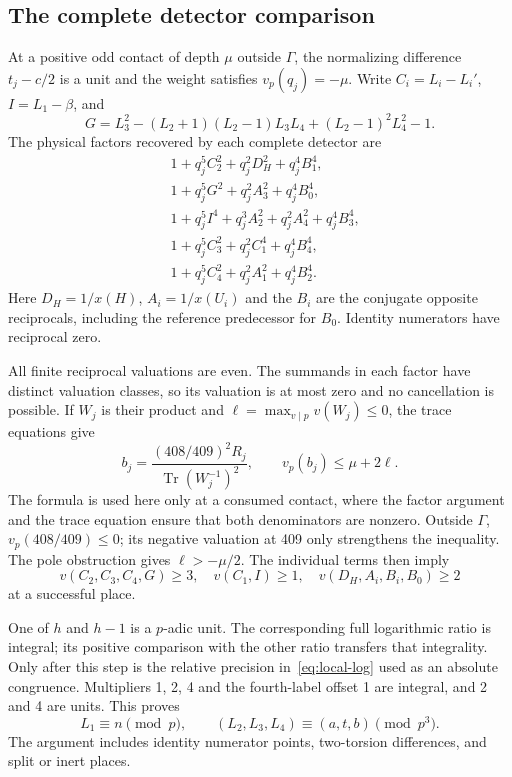\documentclass[11pt,a4paper]{article}
\begin{document}
\subsection{The complete detector comparison}

At a positive odd contact of depth $\mu$ outside $\Gamma$, the
normalizing difference $t_j-c/2$ is a unit and the weight satisfies
$v_p(q_j)=-\mu$.
Write $C_i=L_i-L_i'$, $I=L_1-\beta$, and
\[
 G=L_3^2-(L_2+1)(L_2-1)L_3L_4+(L_2-1)^2L_4^2-1.
\]
The physical factors recovered by each complete detector are
\begin{align*}
 &1+q_j^5C_2^2+q_j^2D_H^2+q_j^4B_1^4,\\
 &1+q_j^5G^2+q_j^2A_3^2+q_j^4B_0^4,\\
 &1+q_j^5I^4+q_j^3A_2^2+q_j^2A_4^2+q_j^4B_3^4,\\
 &1+q_j^5C_3^2+q_j^2C_1^4+q_j^4B_4^4,\\
 &1+q_j^5C_4^2+q_j^2A_1^2+q_j^4B_2^4.
\end{align*}
Here $D_H=1/x(H)$, $A_i=1/x(U_i)$ and the $B_i$ are the
conjugate opposite reciprocals, including the reference predecessor
for $B_0$. Identity numerators have reciprocal zero.

All finite reciprocal valuations are even. The summands in each
factor have distinct valuation classes, so its valuation is at most
zero and no cancellation is possible. If $W_j$ is their product
and $\ell=\max_{v\mid p}v(W_j)\le0$, the trace equations give
\[
 b_j=\frac{(408/409)^2R_j}{\operatorname{Tr}(W_j^{-1})^2},
 \qquad v_p(b_j)\le\mu+2\ell.
\]
The formula is used here only at a consumed contact, where the
factor argument and the trace equation ensure that both denominators
are nonzero. Outside $\Gamma$, $v_p(408/409)\le0$; its negative
valuation at 409 only strengthens the inequality.
The pole obstruction gives $\ell>-\mu/2$. The individual terms
then imply
\[
 v(C_2,C_3,C_4,G)\ge3,\quad v(C_1,I)\ge1,
 \quad v(D_H,A_i,B_i,B_0)\ge2
\]
at a successful place.

One of $h$ and $h-1$ is a $p$-adic unit. The corresponding full
logarithmic ratio is integral; its positive comparison with the
other ratio transfers that integrality. Only after this step is
the relative precision in~\eqref{eq:local-log} used as an absolute
congruence. Multipliers 1, 2, 4 and the fourth-label offset 1
are integral, and 2 and 4 are units. This proves
\[
 L_1\equiv n\pmod p,\qquad
             (L_2,L_3,L_4)\equiv(a,t,b)\pmod{p^3}.
\]
The argument includes identity numerator points, two-torsion
differences, and split or inert places.
\end{document}
